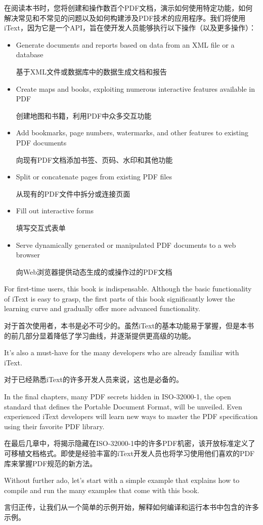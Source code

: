 \documentclass{book}
\begin{document}
在阅读本书时，您将创建和操作数百个PDF文档，演示如何使用特定功能，如何解决常见和不常见的问题以及如何构建涉及PDF技术的应用程序。我们将使用iText，因为它是一个API，旨在使开发人员能够执行以下操作（以及更多操作）：
\begin{itemize}
\item
Generate documents and reports based on data from an XML file or a database

基于XML文件或数据库中的数据生成文档和报告

\item
Create maps and books, exploiting numerous interactive features available in PDF

创建地图和书籍，利用PDF中众多交互功能
\item
Add bookmarks, page numbers, watermarks, and other features to existing PDF
documents

向现有PDF文档添加书签、页码、水印和其他功能

\item
Split or concatenate pages from existing PDF files

从现有的PDF文件中拆分或连接页面
\item
Fill out interactive forms

填写交互式表单
\item
Serve dynamically generated or manipulated PDF documents to a web browser 

向Web浏览器提供动态生成的或操作过的PDF文档
\end{itemize}
For first-time users, this book is indispensable. Although the basic functionality of iText is easy to grasp, the first parts of this book significantly lower the learning curve and gradually offer more advanced functionality.

对于首次使用者，本书是必不可少的。虽然iText的基本功能易于掌握，但是本书的前几部分显着降低了学习曲线，并逐渐提供更高级的功能。

It’s also a must-have for the many developers who are already familiar with iText.

对于已经熟悉iText的许多开发人员来说，这也是必备的。

In the final chapters, many PDF secrets hidden in ISO-32000-1, the open standard that defines the Portable Document Format, will be unveiled. Even experienced iText developers will learn new ways to master the PDF specification using their favorite PDF library.

在最后几章中，将揭示隐藏在ISO-32000-1中的许多PDF机密，该开放标准定义了可移植文档格式。即使是经验丰富的iText开发人员也将学习使用他们喜欢的PDF库来掌握PDF规范的新方法。

Without further ado, let’s start with a simple example that explains how to compile and run the many examples that come with this book.

言归正传，让我们从一个简单的示例开始，解释如何编译和运行本书中包含的许多示例。
\end{document}
